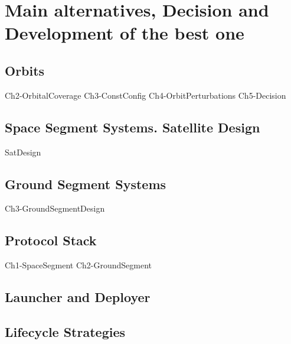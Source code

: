 \chapter{Main alternatives, Decision and Development of the best one}

\section{Orbits}
{Ch2-OrbitalCoverage}
{Ch3-ConstConfig}
{Ch4-OrbitPerturbations}
{Ch5-Decision}

\section{Space Segment Systems. Satellite Design}
{SatDesign}

\section{Ground Segment Systems}
{Ch3-GroundSegmentDesign}

\section{Protocol Stack}
{Ch1-SpaceSegment}
{Ch2-GroundSegment}

\section{Launcher and Deployer}

\section{Lifecycle Strategies}
